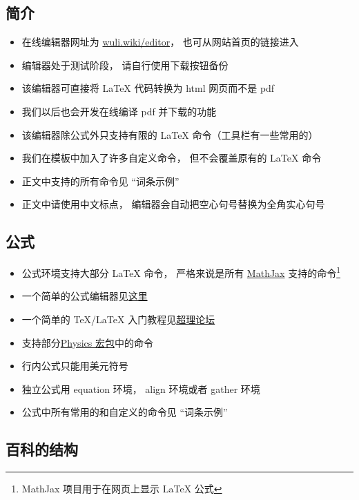 
\subsection{简介}
\begin{itemize}
\item 在线编辑器网址为 \href{http://wuli.wiki/editor}{wuli.wiki/editor}， 也可从网站首页的链接进入
\item 编辑器处于测试阶段， 请自行使用下载按钮备份
\item 该编辑器可直接将 LaTeX 代码转换为 html 网页而不是 pdf
\item 我们以后也会开发在线编译 pdf 并下载的功能
\item 该编辑器除公式外只支持有限的 LaTeX 命令（工具栏有一些常用的）
\item 我们在模板中加入了许多自定义命令， 但不会覆盖原有的 LaTeX 命令
\item 正文中支持的所有命令见 “词条示例”
\item 正文中请使用中文标点， 编辑器会自动把空心句号替换为全角实心句号
\end{itemize}

\subsection{公式}
\begin{itemize}
\item 公式环境支持大部分 LaTeX 命令， 严格来说是所有 \href{https://www.mathjax.org/}{MathJax} 支持的命令\footnote{MathJax 项目用于在网页上显示 LaTeX 公式}
\item 一个简单的公式编辑器见\href{https://www.codecogs.com/latex/eqneditor.php}{这里}
\item 一个简单的 TeX/LaTeX 入门教程见\href{https://chaoli.club/index.php/211}{超理论坛}
\item 支持部分\href{http://mirrors.ibiblio.org/CTAN/macros/latex/contrib/physics/physics.pdf}{Physics 宏包}中的命令
\item 行内公式只能用美元符号
\item 独立公式用 equation 环境， align 环境或者 gather 环境
\item 公式中所有常用的和自定义的命令见 “词条示例”
\end{itemize}

\subsection{百科的结构}

